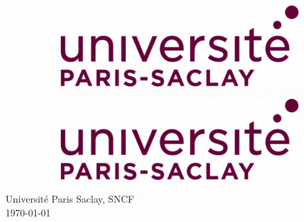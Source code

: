 \begin{titlepage}
\begin{center}
        \begin{figure}[htb]
            \centering
            \begin{subfigure}[htb]{0.20\textwidth}
                \centering
                \includegraphics[width=\textwidth]{logo.png}
            \end{subfigure}
            \begin{subfigure}[htb]{0.10\textwidth}
                \centering
                \includegraphics[width=\textwidth]{logo.png}
            \end{subfigure}
        \end{figure}            
        \Large
        Université Paris Saclay, SNCF\\
        \today \par \vspace{-0.1cm}            
    \end{center}
\end{titlepage}


\begin{abstract}
\end{abstract}

\tableofcontents
\adjustmtc
\newpage
\listoffigures
\newpage


%


%





